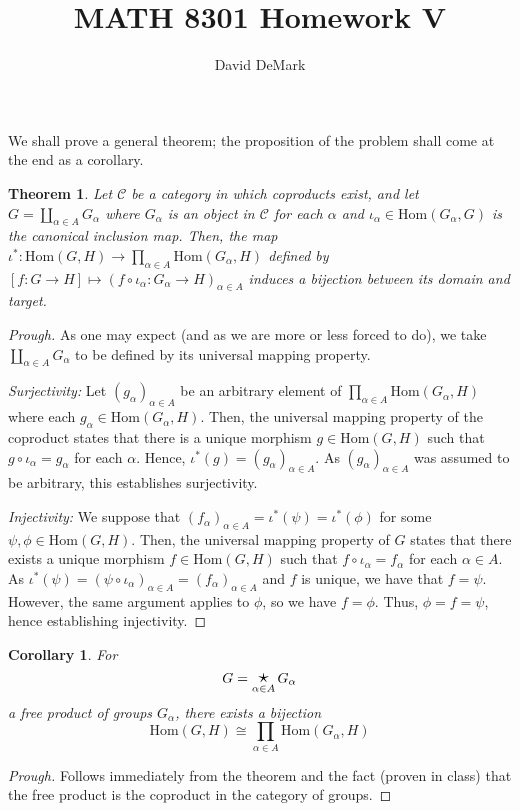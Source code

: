 \documentclass[english]{article}
\title{MATH 8301 Homework V}
\author{David DeMark}
\date{\due}
\newenvironment{subproof}[1][\proofname]{%
	\renewcommand{\qedsymbol}{$\blacksquare$}%
	\begin{proof}[#1]%
	}{%
	\end{proof}%
}
\newcommand{\prob}[1]{\setcounter{section}{#1-1}\section{}}
\newtheorem*{theorem*}{Theorem}
\newtheorem{corollary}[theorem]{Corollary}
\theoremstyle{remark}
\theoremstyle{definition}
\newcommand{\Ccal}{\mathcal{C}}
\renewcommand{\hom}{\mathrm{Hom}}
\newcommand{\frp}{\mathop{\large {\mathlarger{\star}}}}
\begin{document}
	\maketitle
\prob{1}
We shall prove a general theorem; the proposition of the problem shall come at the end as a corollary.
\begin{theorem*}
Let $\Ccal$ be a category in which coproducts exist, and let $G=\coprod_{\alpha\in A} G_\alpha$ where $G_\alpha$ is an object in $\Ccal$ for each $\alpha$ and $\iota_\alpha\in \hom(G_\alpha,G)$ is the canonical inclusion map. Then, the map $\iota^*:\hom(G,H)\to \prod_{\alpha\in A}\hom(G_\alpha,H)$ defined by $[f:G\to H]\mapsto (f\circ \iota_\alpha: G_\alpha\to H)_{\alpha\in A}$ induces a bijection between its domain and target.
\end{theorem*}
\begin{subproof}[Prough]
	As one may expect (and as we are more or less forced to do), we take $\coprod_{\alpha\in A}G_\alpha$ to be defined by its universal mapping property.
	
\emph{Surjectivity:} Let $(g_\alpha)_{\alpha\in A}$ be an arbitrary element of $\prod_{{\alpha\in A}}\hom(G_\alpha,H)$ where each $g_\alpha\in \hom(G_\alpha,H)$. Then, the universal mapping property of the coproduct states that there is a unique morphism $g\in\hom(G,H)$ such that $g\circ \iota_\alpha=g_\alpha$ for each $\alpha$. Hence, $\iota^*(g)= (g_\alpha)_{\alpha\in A}$. As $(g_\alpha)_{\alpha\in A}$ was assumed to be arbitrary, this establishes surjectivity.

\emph{Injectivity:} We suppose that $(f_\alpha)_{\alpha\in A}=\iota^*(\psi)=\iota^*(\phi)$ for some $\psi,\phi\in\hom(G,H)$. Then, the universal mapping property of $G$ states that there exists a unique morphism $f\in \hom(G,H)$ such that $f\circ\iota_{\alpha}=f_{\alpha}$ for each $\alpha\in A$. As $\iota^*(\psi)=(\psi\circ \iota_{\alpha})_{\alpha\in A}=(f_\alpha)_{\alpha\in A}$ and $f$ is unique, we have that $f=\psi$. However, the same argument applies to $\phi$, so we have $f=\phi$. Thus, $\phi=f=\psi$, hence establishing injectivity.
\end{subproof}
\begin{corollary}
	For $$G=\frp_{\alpha\in A}G_{\alpha}$$ a free product of groups $G_\alpha$, there exists a bijection $$\hom(G,H)\cong \prod_{\alpha\in A}\hom(G_\alpha,H)$$
\end{corollary}
\begin{proof}[Prough]
	Follows immediately from the theorem and the fact (proven in class) that the free product is the coproduct in the category of groups.
\end{proof}
\end{document}
